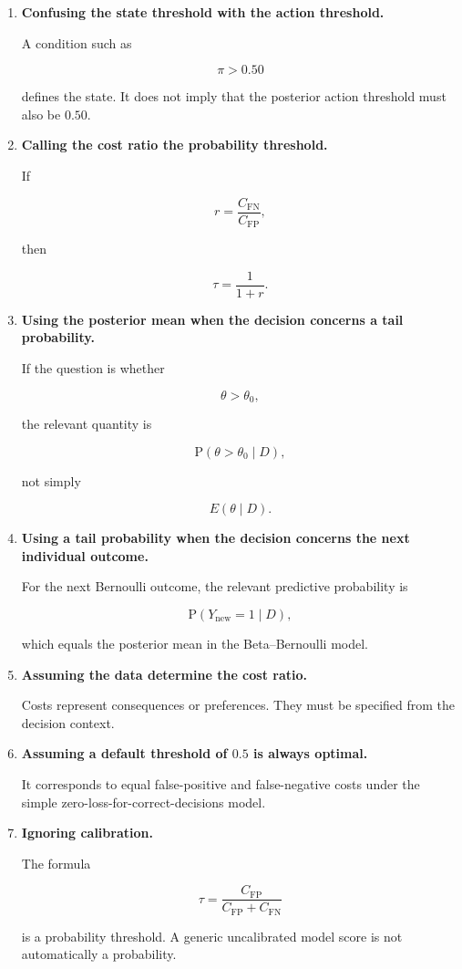\documentclass[11pt]{article}
\newcommand{\CFP}{C_{\mathrm{FP}}}
\newcommand{\CFN}{C_{\mathrm{FN}}}
\newcommand{\Prob}{\mathrm{P}}
\begin{document}
\begin{enumerate}[label=\arabic*.]
    \item \textbf{Confusing the state threshold with the action threshold.}

    A condition such as

    \[
    \pi>0.50
    \]

    defines the state. It does not imply that the posterior action threshold must also be $0.50$.

    \item \textbf{Calling the cost ratio the probability threshold.}

    If

    \[
    r=\frac{\CFN}{\CFP},
    \]

    then

    \[
    \tau=\frac{1}{1+r}.
    \]

    \item \textbf{Using the posterior mean when the decision concerns a tail probability.}

    If the question is whether

    \[
    \theta>\theta_0,
    \]

    the relevant quantity is

    \[
    \Prob(\theta>\theta_0\mid D),
    \]

    not simply

    \[
    E(\theta\mid D).
    \]

    \item \textbf{Using a tail probability when the decision concerns the next individual outcome.}

    For the next Bernoulli outcome, the relevant predictive probability is

    \[
    \Prob(Y_{\mathrm{new}}=1\mid D),
    \]

    which equals the posterior mean in the Beta--Bernoulli model.

    \item \textbf{Assuming the data determine the cost ratio.}

    Costs represent consequences or preferences. They must be specified from the decision context.

    \item \textbf{Assuming a default threshold of $0.5$ is always optimal.}

    It corresponds to equal false-positive and false-negative costs under the simple zero-loss-for-correct-decisions model.

    \item \textbf{Ignoring calibration.}

    The formula

    \[
    \tau=\frac{\CFP}{\CFP+\CFN}
    \]

    is a probability threshold. A generic uncalibrated model score is not automatically a probability.
\end{enumerate}
\end{document}
